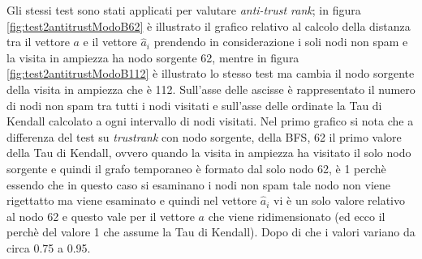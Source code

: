 Gli stessi test sono stati applicati per valutare \textit{anti-trust rank}; in figura \ref{fig:test2antitrustModoB62} è illustrato il grafico relativo al calcolo della distanza tra il vettore \(a\) e il vettore \(\hat{a}_i\) prendendo in considerazione i soli nodi non spam e la visita in ampiezza ha nodo sorgente 62, mentre in figura \ref{fig:test2antitrustModoB112} è illustrato lo stesso test ma cambia il nodo sorgente della visita in ampiezza che è 112. Sull'asse delle ascisse è rappresentato il numero di nodi non spam tra tutti i nodi visitati e sull'asse delle ordinate la Tau di Kendall calcolato a ogni intervallo di nodi visitati. Nel primo grafico si nota che a differenza del test su \textit{trustrank} con nodo sorgente, della BFS, 62 il primo valore della Tau di Kendall, ovvero quando la visita in ampiezza ha visitato il solo nodo sorgente e quindi il grafo temporaneo è formato dal solo nodo 62, è 1 perchè essendo che in questo caso si esaminano i nodi non spam tale nodo non viene rigettatto ma viene esaminato e quindi nel vettore \(\hat{a}_i\) vi è un solo valore relativo al nodo 62 e questo vale per il vettore \(a\) che viene ridimensionato (ed ecco il perchè del valore 1 che assume la Tau di Kendall). Dopo di che i valori variano da circa 0.75 a 0.95.
